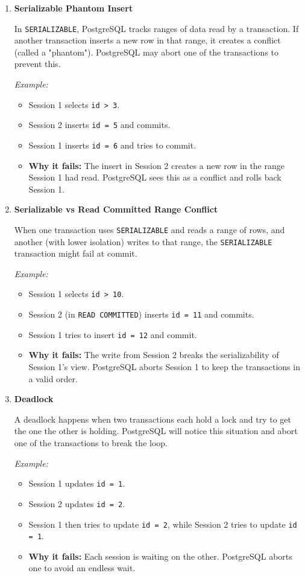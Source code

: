 \documentclass{article}
\begin{document}
\begin{enumerate}[label=\alph*)]
\begin{enumerate}
    \item \textbf{Serializable Phantom Insert}

    In \texttt{SERIALIZABLE}, PostgreSQL tracks ranges of data read by a transaction. If another transaction inserts a new row in that range, it creates a conflict (called a "phantom"). PostgreSQL may abort one of the transactions to prevent this.

    \textit{Example:}
    \begin{itemize}
        \item Session 1 selects \texttt{id > 3}.
        \item Session 2 inserts \texttt{id = 5} and commits.
        \item Session 1 inserts \texttt{id = 6} and tries to commit.
        \item \textbf{Why it fails:} The insert in Session 2 creates a new row in the range Session 1 had read. PostgreSQL sees this as a conflict and rolls back Session 1.
    \end{itemize}

    \item \textbf{Serializable vs Read Committed Range Conflict}

When one transaction uses \texttt{SERIALIZABLE} and reads a range of rows, 
and another (with lower isolation) writes to that range, the 
\texttt{SERIALIZABLE} transaction might fail at commit.

    \textit{Example:}
    \begin{itemize}
        \item Session 1 selects \texttt{id > 10}.
        \item Session 2 (in \texttt{READ COMMITTED}) inserts \texttt{id = 11} and commits.
        \item Session 1 tries to insert \texttt{id = 12} and commit.
        \item \textbf{Why it fails:} The write from Session 2 breaks the serializability of Session 1's view. PostgreSQL aborts Session 1 to keep the transactions in a valid order.
    \end{itemize}

    \item \textbf{Deadlock}

    A deadlock happens when two transactions each hold a lock and try to get the one the other is holding. PostgreSQL will notice this situation and abort one of the transactions to break the loop.

    \textit{Example:}
    \begin{itemize}
        \item Session 1 updates \texttt{id = 1}.
        \item Session 2 updates \texttt{id = 2}.
        \item Session 1 then tries to update \texttt{id = 2}, while Session 2 tries to update \texttt{id = 1}.
        \item \textbf{Why it fails:} Each session is waiting on the other. PostgreSQL aborts one to avoid an endless wait.
    \end{itemize}



\end{enumerate}
\end{enumerate}
\end{document}
